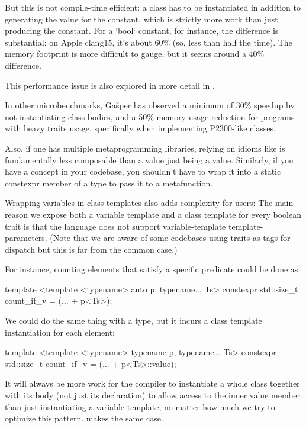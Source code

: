 \documentclass{wg21}
\begin{document}
But this is not compile-time efficient: a class has to be instantiated in addition to generating the value for the constant, which is strictly more work than just producing the constant.
For a `bool` constant, for instance, the difference is substantial; on Apple clang15, it's about 60\% (so, less than half the time).
The memory footprint is more difficult to gauge, but it seems around a 40\% difference.

This performance issue is also explored in more detail in .

In other microbenchmarks, Gašper has observed a minimum of 30\% speedup by not instantiating class bodies, and a 50\% memory usage reduction for programs with heavy traits usage, specifically when implementing P2300-like classes.

Also, if one has multiple metaprogramming libraries, relying on idioms like  is fundamentally less composable than a value just being a value.
Similarly, if you have a concept in your codebase, you shouldn't have to wrap it into a static constexpr  member of a type to pass it to a metafunction.

Wrapping variables in class templates also adds complexity for users: The main reason we expose both a variable template and a class template for every boolean trait is that the language does not support variable-template template-parameters. (Note that we are aware of some codebases using traits as tags for dispatch but this is far from the common case.)

For instance, counting elements  that satisfy a specific predicate  could be done as

\begin{colorblock}
template <template <typename> auto p, typename... Ts>
constexpr std::size_t count_if_v = (... + p<Ts>);
\end{colorblock}

We could do the same thing with a type, but it incurs a class template instantiation for each element:

\begin{colorblock}
template <template <typename> typename p, typename... Ts>
constexpr std::size_t count_if_v = (... + p<Ts>::value);
\end{colorblock}

It will always be more work for the compiler to instantiate a whole class together with its body (not just its declaration) to allow access to the inner value member than just instantiating a variable template, no matter how much we try to optimize this pattern.  makes the same case.
\end{document}

